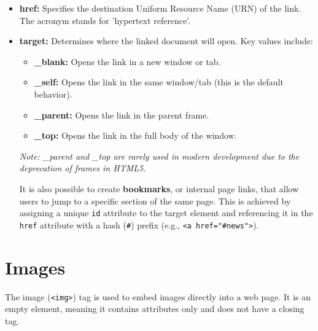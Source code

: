\documentclass{scrbook}
\begin{document}
\begin{itemize}
    \item
    \textbf{href:} Specifies the destination Uniform Resource Name (URN) of the link. The acronym stands for 'hypertext reference'.

    \item
    \textbf{target:} Determines where the linked document will open. Key values include:
    
    \begin{itemize}
        \item
        \textbf{\_blank:} Opens the link in a new window or tab.

        \item
        \textbf{\_self:} Opens the link in the same window/tab (this is the default behavior).

        \item
        \textbf{\_parent:} Opens the link in the parent frame.

        \item
        \textbf{\_top:} Opens the link in the full body of the window.
    \end{itemize}
    
     \textit{Note: \_parent and \_top are rarely used in modern development due to the deprecation of frames in HTML5.}

     It is also possible to create \textbf{bookmarks}, or internal page links, that allow users to jump to a specific section of the same page. This is achieved by assigning a unique \texttt{id} attribute to the target element and referencing it in the \texttt{href} attribute with a hash (\texttt{\#}) prefix (e.g., \texttt{<a href="\#news">}).
\end{itemize}

\section{Images}

The image (\texttt{<img>}) tag is used to embed images directly into a web page. It is an empty element, meaning it contains attributes only and does not have a closing tag.
\end{document}
